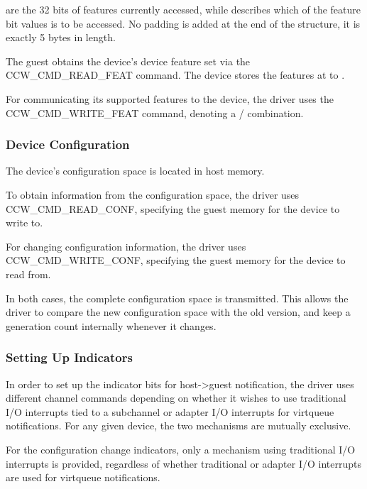  are the 32 bits of features currently accessed, while
 describes which of the feature bit values is to be
accessed. No padding is added at the end of the structure, it is
exactly 5 bytes in length.

The guest obtains the device's device feature set via the
CCW_CMD_READ_FEAT command. The device stores the features at 
to .

For communicating its supported features to the device, the driver
uses the CCW_CMD_WRITE_FEAT command, denoting a /
combination.

\subsubsection{Device Configuration}\label{sec:Virtio Transport Options / Virtio over channel I/O / Device Initialization / Device Configuration}

The device's configuration space is located in host memory.

To obtain information from the configuration space, the driver
uses CCW_CMD_READ_CONF, specifying the guest memory for the device
to write to.

For changing configuration information, the driver uses
CCW_CMD_WRITE_CONF, specifying the guest memory for the device to
read from.

In both cases, the complete configuration space is transmitted.  This
allows the driver to compare the new configuration space with the old
version, and keep a generation count internally whenever it changes.

\subsubsection{Setting Up Indicators}\label{sec:Virtio Transport Options / Virtio over channel I/O / Device Initialization / Setting Up Indicators}

In order to set up the indicator bits for host->guest notification,
the driver uses different channel commands depending on whether it
wishes to use traditional I/O interrupts tied to a subchannel or
adapter I/O interrupts for virtqueue notifications. For any given
device, the two mechanisms are mutually exclusive.

For the configuration change indicators, only a mechanism using
traditional I/O interrupts is provided, regardless of whether
traditional or adapter I/O interrupts are used for virtqueue
notifications.

